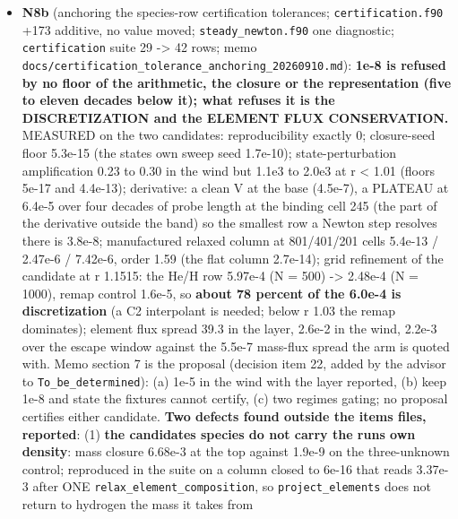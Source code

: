\documentclass[english,a4paper]{my_memo}
\begin{document}
\begin{itemize}
  stale test header, \texttt{Run\ mode} in the input schema). (a), the column
  preconditioner, waits for N8b\textquotesingle s numbers. The user manual PDF was rebuilt
  by the advisor (85 pages; it was two keys behind its source: \texttt{Restart\ intent}, \texttt{Restart\ option\ change}).
\item
  \textbf{N8b} (anchoring the species-row certification tolerances;
  \texttt{certification.f90} +173 additive, no value moved; \texttt{steady\_newton.f90} one
  diagnostic; \texttt{certification} suite 29 -\textgreater{} 42 rows; memo
  \texttt{docs/certification\_tolerance\_anchoring\_20260910.md}): \textbf{1e-8 is refused
  by no floor of the arithmetic, the closure or the representation (five to
  eleven decades below it); what refuses it is the DISCRETIZATION and the
  ELEMENT FLUX CONSERVATION.} MEASURED on the two candidates: reproducibility
  exactly 0; closure-seed floor 5.3e-15 (the state\textquotesingle s own sweep seed
  1.7e-10); state-perturbation amplification 0.23 to 0.30 in the wind but
  1.1e3 to 2.0e3 at r \textless{} 1.01 (floors 5e-17 and 4.4e-13); derivative: a
  clean V at the base (4.5e-7), a PLATEAU at 6.4e-5 over four decades of
  probe length at the binding cell 245 (the part of the derivative outside
  the band) so the smallest row a Newton step resolves there is 3.8e-8;
  manufactured relaxed column at 801/401/201 cells 5.4e-13 / 2.47e-6 /
  7.42e-6, order 1.59 (the flat column 2.7e-14); grid refinement of the
  candidate at r 1.1515: the He/H row 5.97e-4 (N = 500) -\textgreater{} 2.48e-4 (N =
  1000), remap control 1.6e-5, so \textbf{about 78 percent of the 6.0e-4 is
  discretization} (a C2 interpolant is needed; below r 1.03 the remap
  dominates); element flux spread 39.3 in the layer, 2.6e-2 in the wind,
  2.2e-3 over the escape window against the 5.5e-7 mass-flux spread the arm
  is quoted with. Memo section 7 is the proposal (decision item 22, added
  by the advisor to \texttt{To\_be\_determined}): (a) 1e-5 in the wind with the layer
  reported, (b) keep 1e-8 and state the fixtures cannot certify, (c) two
  regimes gating; no proposal certifies either candidate. \textbf{Two defects found
  outside the item\textquotesingle s files, reported}: (1) \textbf{the candidate\textquotesingle s species do not
  carry the run\textquotesingle s own density}: mass closure 6.68e-3 at the top against
  1.9e-9 on the three-unknown control; reproduced in the suite on a column
  closed to 6e-16 that reads 3.37e-3 after ONE \texttt{relax\_element\_composition},
  so \texttt{project\_elements} does not return to hydrogen the mass it takes from

\end{itemize}
\end{document}
